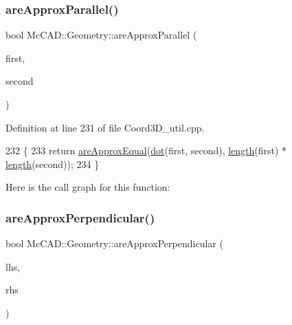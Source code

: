 \subsubsection{\texorpdfstring{are\+Approx\+Parallel()}{areApproxParallel()}\hspace{0.1cm}{\footnotesize\ttfamily [2/2]}}
{\footnotesize\ttfamily bool Mc\+C\+A\+D\+::\+Geometry\+::are\+Approx\+Parallel (\begin{DoxyParamCaption}\item[{const \hyperlink{classMcCAD_1_1Geometry_1_1Coord3D}{Coord3D} \&}]{first,  }\item[{const \hyperlink{classMcCAD_1_1Geometry_1_1Coord3D}{Coord3D} \&}]{second }\end{DoxyParamCaption})}



Definition at line 231 of file Coord3\+D\+\_\+util.\+cpp.


\begin{DoxyCode}
232                               \{
233     \textcolor{keywordflow}{return} \hyperlink{namespaceMcCAD_1_1Geometry_acad920c663ce775977ff6dc46b1030af}{areApproxEqual}(\hyperlink{namespaceMcCAD_1_1Geometry_a3115a59f432b3fc11f4bac6ee17d979b}{dot}(first, second), \hyperlink{namespaceMcCAD_1_1Geometry_ad2997914c766f1fc561cdd30032b6777}{length}(first) * 
      \hyperlink{namespaceMcCAD_1_1Geometry_ad2997914c766f1fc561cdd30032b6777}{length}(second));
234 \}
\end{DoxyCode}
Here is the call graph for this function\+:
\mbox{\label{namespaceMcCAD_1_1Geometry_a04e507abd8d33cbd2ffc90b829c9f37a}} 
\subsubsection{\texorpdfstring{are\+Approx\+Perpendicular()}{areApproxPerpendicular()}\hspace{0.1cm}{\footnotesize\ttfamily [1/2]}}
{\footnotesize\ttfamily bool Mc\+C\+A\+D\+::\+Geometry\+::are\+Approx\+Perpendicular (\begin{DoxyParamCaption}\item[{const \hyperlink{classMcCAD_1_1Geometry_1_1Coord2D}{Coord2D} \&}]{lhs,  }\item[{const \hyperlink{classMcCAD_1_1Geometry_1_1Coord2D}{Coord2D} \&}]{rhs }\end{DoxyParamCaption})}



